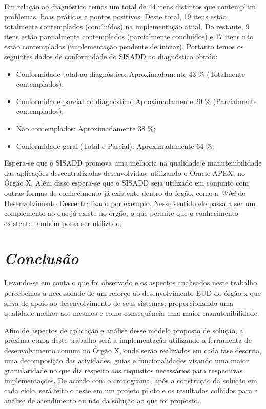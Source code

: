 Em relação ao diagnóstico temos um total de 44 itens distintos que contemplam problemas, boas práticas e pontos positivos. Deste total, 19 itens estão totalmente contemplados (concluídos) na implementação atual. Do restante, 9 itens estão parcialmente contemplados (parcialmente concluídos) e 17 itens não estão contemplados (implementação pendente de iniciar). Portanto temos os seguintes dados de conformidade do SISADD ao diagnóstico obtido:
\begin{itemize}
\item Conformidade total ao diagnóstico: Aproximadamente 43 \% (Totalmente contemplados);
\item Conformidade parcial ao diagnóstico: Aproximadamente 20 \% (Parcialmente contemplados);
\item Não contemplados: Aproximadamente 38 \%;
\item Conformidade geral (Total e Parcial): Aproximadamente 64 \%;
\end{itemize}

Espera-se que o SISADD promova uma melhoria na qualidade e manutenibilidade das aplicações descentralizadas desenvolvidas, utilizando o Oracle APEX, no Órgão X. Além disso espera-se que o SISADD seja utilizado em conjunto com outras formas de conhecimento já existente dentro do órgão, como a \textit{Wiki} do Desenvolvimento Descentralizado por exemplo. Nesse sentido ele passa a ser um complemento ao que já existe no órgão, o que permite que o conhecimento existente também possa ser utilizado.

\section{\textit{Conclusão}}

Levando-se em conta o que foi observado e os aspectos analisados neste trabalho, percebemos a necessidade de um reforço ao desenvolvimento EUD do órgão x que sirva de apoio ao desenvolvimento de seus sistemas, proporcionando uma qualidade melhor aos mesmos e como consequência uma maior manutenibilidade.

Afim de aspectos de aplicação e análise desse modelo proposto de solução, a próxima etapa deste trabalho será a implementação utilizando a ferramenta de desenvolvimento comum no Órgão X, onde serão realizados em cada fase descrita, uma decomposição das atividades, guias e funcionalidades visando uma maior granularidade no que diz respeito aos requisitos necessários para respectivas implementações. De acordo com o cronograma, após a construção da solução em cada ciclo, será feito o teste em um projeto piloto e os resultados colhidos para a análise de atendimento ou não da solução ao que foi proposto.
